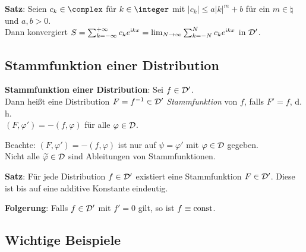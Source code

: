 \textbf{Satz}:
Seien $c_k \in \complex$ für $k \in \integer$ mit
$|c_k| \le a |k|^m + b$ für ein $m \in \natural$ und $a, b > 0$.\\
Dann konvergiert $S = \sum_{k=-\infty}^{+\infty} c_k e^{\mathrm{i} kx} =
\lim_{N \to \infty} \sum_{k=-N}^N c_k e^{\mathrm{i} kx}$ in $\mathcal{D}'$.

\subsection{%
    Stammfunktion einer Distribution%
}

\textbf{Stammfunktion einer Distribution}:
Sei $f \in \mathcal{D}'$.\\
Dann heißt eine Distribution $F = f^{-1} \in \mathcal{D}'$
\emph{Stammfunktion} von $f$, falls $F' = f$, d.\,h.\\
$(F, \varphi') = -(f, \varphi)$ für alle $\varphi \in \mathcal{D}$.

Beachte:
$(F, \varphi') = -(f, \varphi)$ ist nur auf $\psi = \varphi'$ mit
$\varphi \in \mathcal{D}$ gegeben.\\
Nicht alle $\widetilde{\varphi} \in \mathcal{D}$ sind Ableitungen von Stammfunktionen.

\textbf{Satz}:
Für jede Distribution $f \in \mathcal{D}'$ existiert eine Stammfunktion $F \in \mathcal{D}'$.
Diese ist bis auf eine additive Konstante eindeutig.

\textbf{Folgerung}:
Falls $f \in \mathcal{D}'$ mit $f' = 0$ gilt, so ist $f \equiv \operatorname{const}$.

\pagebreak

\subsection{%
    Wichtige Beispiele%
}


